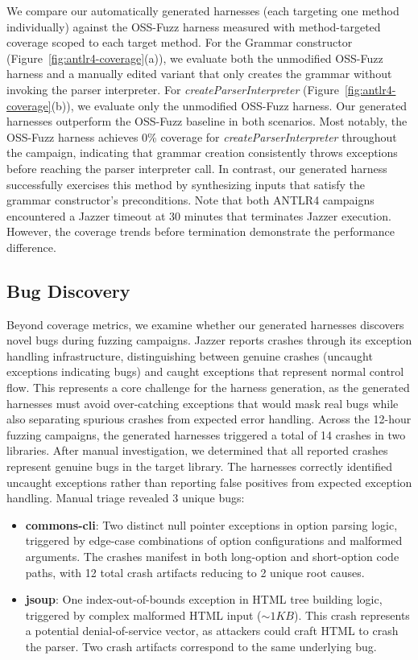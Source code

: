 We compare our automatically generated harnesses (each targeting one method individually) against the OSS-Fuzz harness measured with method-targeted coverage scoped to each target method. For the Grammar constructor (Figure~\ref{fig:antlr4-coverage}(a)), we evaluate both the unmodified OSS-Fuzz harness and a manually edited variant that only creates the grammar without invoking the parser interpreter. For \textit{createParserInterpreter} (Figure~\ref{fig:antlr4-coverage}(b)), we evaluate only the unmodified OSS-Fuzz harness.
Our generated harnesses outperform the OSS-Fuzz baseline in both scenarios. Most notably, the OSS-Fuzz harness achieves 0\% coverage for \textit{createParserInterpreter} throughout the campaign, indicating that grammar creation consistently throws exceptions before reaching the parser interpreter call. In contrast, our generated harness successfully exercises this method by synthesizing inputs that satisfy the grammar constructor's preconditions. Note that both ANTLR4 campaigns encountered a Jazzer timeout at 30 minutes that terminates Jazzer execution. However, the coverage trends before termination demonstrate the performance difference.
%
\subsection{Bug Discovery}%
\label{subsec:bug-discovery}
Beyond coverage metrics, we examine whether our generated harnesses discovers novel bugs during fuzzing campaigns. Jazzer reports crashes through its exception handling infrastructure, distinguishing between genuine crashes (uncaught exceptions indicating bugs) and caught exceptions that represent normal control flow. This represents a core challenge for the harness generation, as the generated harnesses must avoid over-catching exceptions that would mask real bugs while also separating spurious crashes from expected error handling.
Across the 12-hour fuzzing campaigns, the generated harnesses triggered a total of 14 crashes in two libraries. After manual investigation, we determined that all reported crashes represent genuine bugs in the target library. The harnesses correctly identified uncaught exceptions rather than reporting false positives from expected exception handling. Manual triage revealed 3 unique bugs:

\begin{itemize}
\item \textbf{commons-cli}: Two distinct null pointer exceptions in option parsing logic, triggered by edge-case combinations of option configurations and malformed arguments. The crashes manifest in both long-option and short-option code paths, with 12 total crash artifacts reducing to 2 unique root causes.
\item \textbf{jsoup}: One index-out-of-bounds exception in HTML tree building logic, triggered by complex malformed HTML input ($\sim 1KB$). This crash represents a potential denial-of-service vector, as attackers could craft HTML to crash the parser. Two crash artifacts correspond to the same underlying bug.
\end{itemize}

